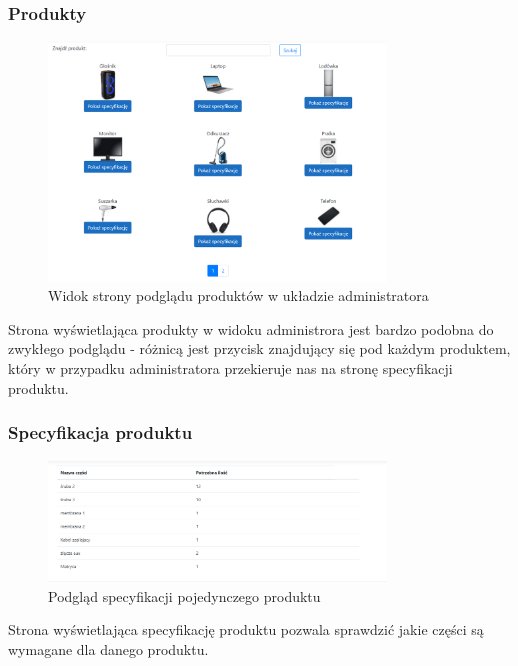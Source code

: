 \documentclass{article}
\begin{document}
\subsubsection{Produkty}
\begin{figure}[H]
   \centering
   \includegraphics[width=0.8\textwidth,frame]{Wyglad/produkty_admin.png}
   \caption{Widok strony podglądu produktów w układzie administratora}
\end{figure}
Strona wyświetlająca produkty w widoku administrora jest bardzo podobna do
zwykłego podglądu - różnicą jest przycisk znajdujący się pod każdym produktem,
który w przypadku administratora przekieruje nas na stronę specyfikacji
produktu.

\subsubsection{Specyfikacja produktu}
\begin{figure}[H]
   \centering
   \includegraphics[width=0.8\textwidth,frame]{Wyglad/spec.png}
   \caption{Podgląd specyfikacji pojedynczego produktu}
\end{figure}
Strona wyświetlająca specyfikację produktu pozwala sprawdzić jakie części są
wymagane dla danego produktu.
\end{document}
